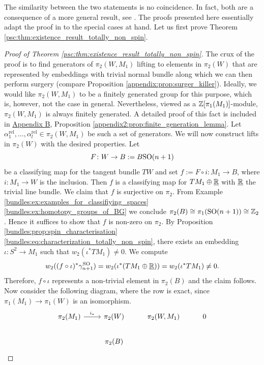 The similarity between the two statements is no coincidence. In fact, both are a consequence of a more general result, see \cite[Thm. 1.5]{FrenckEbertChernysh}. The proofs presented here essentially adapt the proof in \cite{FrenckEbertChernysh} to the special cases at hand. Let us first prove Theorem \ref{psc:thm:existence_result_totally_non_spin}.

\begin{proof}[Proof of Theorem \ref{psc:thm:existence_result_totally_non_spin}]
The crux of the proof is to find generators of $\pi_2(W,M_1)$ lifting to elements in $\pi_2(W)$ that are represented by embeddings with trivial normal bundle along which we can then perform surgery (compare Proposition \ref{appendix:prop:surger_killer}). Ideally, we would like $\pi_2(W,M_1)$ to be a finitely generated group for this purpose, which is, however, not the case in general. Nevertheless, viewed as a $\mathbb{Z}[\pi_1(M_1)]$-module, $\pi_2(W,M_1)$ is always finitely generated. A detailed proof of this fact is included in \hyperref[chapter:appendix_b]{Appendix B}, Proposition \ref{appendix2:prop:finite_generation_lemma}. Let $\alpha_1^\mathrm{rel},\ldots, \alpha_l^\mathrm{rel} \in \pi_2(W,M_1)$ be such a set of generators. We will now construct lifts in $\pi_2(W)$ with the desired properties. 
Let
\[
F \colon W \to B := B\mathrm{SO}(n+1)
\]
be a classifying map for the tangent bundle $TW$ and set $f := F \circ i \colon M_1 \to B$, where $i \colon M_1 \to W$ is the inclusion. Then $f$ is a classifying map for $TM_1 \oplus \underline{\mathbb{R}}$ with $\underline{\mathbb{R}}$ the trivial line bundle. We claim that $f$ is surjective on $\pi_2$. From Example \ref{bundles:ex:examples_for_classifiying_spaces} \ref{bundles:ex:homotopy_groups_of_BG} we conclude $\pi_2(B) \cong \pi_1(\mathrm{SO}(n+1)) \cong \mathbb{Z}_2$. Hence it suffices to show that $f$ is non-zero on $\pi_2$. By Proposition \ref{bundles:prop:spin_characterisation} \ref{bundles:eq:characterization_totally_non_spin}, there exists an embedding $\iota \colon S^2 \to M_1$ such that $w_2(\iota^\ast TM_1) \neq 0$. We compute 
\[
w_2((f \circ \iota)^\ast \gamma_{n+1}^{\mathrm{SO}}) = w_2(\iota^\ast (TM_1 \oplus \underline{\mathbb{R}})) = w_2(\iota^\ast TM_1) \neq 0.
\]
Therefore, $f \circ \iota$ represents a non-trivial element in $\pi_2(B)$ and the claim follows. Now consider the following diagram, where the row is exact, since $\pi_1(M_1) \to \pi_1(W)$ is an isomorphism.
\[
\begin{tikzcd}
	{\pi_2(M_1)} & {\pi_2(W)} & {\pi_2(W,M_1)} & 0 \\ 
	& {\pi_2(B)}
	\arrow["{i_\ast}", from=1-1, to=1-2]

\end{tikzcd}\]
\end{proof}
